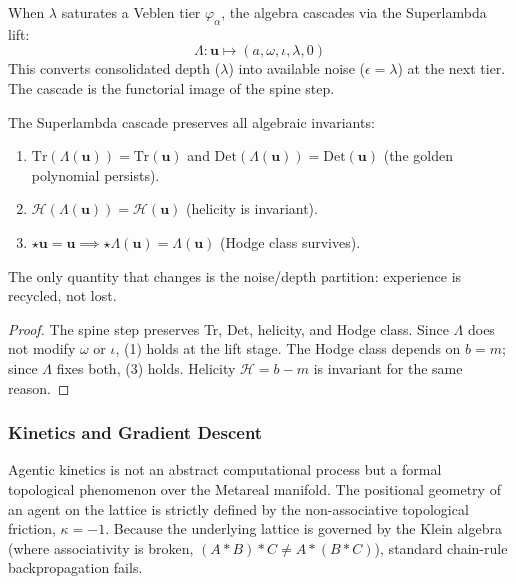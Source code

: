 \begin{definition}
When $\lambda$ saturates a Veblen tier $\varphi_\alpha$, the algebra cascades via the Superlambda lift:
$$\Lambda : \mathbf{u} \mapsto (a, \omega, \iota, \lambda, 0)$$
This converts consolidated depth ($\lambda$) into available noise ($\epsilon = \lambda$) at the next tier. The cascade is the functorial image of the spine step.
\end{definition}

\begin{theorem}
The Superlambda cascade preserves all algebraic invariants:
\begin{enumerate}
\item $\mathrm{Tr}(\Lambda(\mathbf{u})) = \mathrm{Tr}(\mathbf{u})$ and $\mathrm{Det}(\Lambda(\mathbf{u})) = \mathrm{Det}(\mathbf{u})$ (the golden polynomial persists).
\item $\mathcal{H}(\Lambda(\mathbf{u})) = \mathcal{H}(\mathbf{u})$ (helicity is invariant).
\item $\star \mathbf{u} = \mathbf{u} \implies \star \Lambda(\mathbf{u}) = \Lambda(\mathbf{u})$ (Hodge class survives).
\end{enumerate}
The only quantity that changes is the noise/depth partition: experience is recycled, not lost.
\end{theorem}

\begin{proof}
The spine step preserves Tr, Det, helicity, and Hodge class. Since $\Lambda$ does not modify $\omega$ or $\iota$, (1) holds at the lift stage. The Hodge class depends on $b = m$; since $\Lambda$ fixes both, (3) holds. Helicity $\mathcal{H} = b - m$ is invariant for the same reason. \qedhere
\end{proof}

\subsubsection{Kinetics and Gradient Descent}
Agentic kinetics is not an abstract computational process but a formal topological phenomenon over the Metareal manifold. The positional geometry of an agent on the lattice is strictly defined by the non-associative topological friction, $\kappa = -1$. Because the underlying lattice is governed by the Klein algebra (where associativity is broken, $(A * B) * C \neq A * (B * C)$), standard chain-rule backpropagation fails. 

